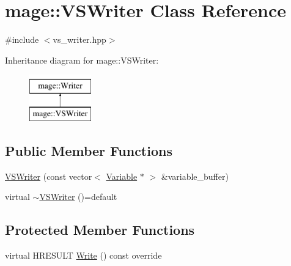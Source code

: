 \hypertarget{classmage_1_1_v_s_writer}{}\section{mage\+:\+:V\+S\+Writer Class Reference}
\label{classmage_1_1_v_s_writer}


{\ttfamily \#include $<$vs\+\_\+writer.\+hpp$>$}

Inheritance diagram for mage\+:\+:V\+S\+Writer\+:\begin{figure}[H]
\begin{center}
\leavevmode
\includegraphics[height=2.000000cm]{classmage_1_1_v_s_writer}
\end{center}
\end{figure}
\subsection*{Public Member Functions}
\begin{DoxyCompactItemize}
\item 
\hyperlink{classmage_1_1_v_s_writer_a401e3661cf197c20a011792221443e8f}{V\+S\+Writer} (const vector$<$ \hyperlink{structmage_1_1_variable}{Variable} $\ast$ $>$ \&variable\+\_\+buffer)
\item 
virtual \hyperlink{classmage_1_1_v_s_writer_ac2268dde1a58f0d1d657e584e33e82fe}{$\sim$\+V\+S\+Writer} ()=default
\end{DoxyCompactItemize}
\subsection*{Protected Member Functions}
\begin{DoxyCompactItemize}
\item 
virtual H\+R\+E\+S\+U\+LT \hyperlink{classmage_1_1_v_s_writer_afda5e71bc0c5c836ab439e2572dcd685}{Write} () const override
\end{DoxyCompactItemize}

